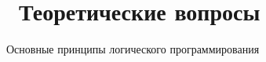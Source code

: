 \chapter{ Теоретические вопросы}
\label{cha:design}

Основные принципы логического программирования
